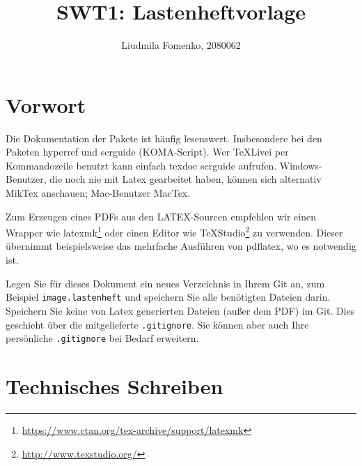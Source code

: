 \documentclass[parskip=full]{scrartcl}
\title{SWT1: Lastenheftvorlage}
\author{Liudmila Fomenko, 2080062}
\begin{document}
\maketitle

%
%
\section{Vorwort}
Die Dokumentation der Pakete ist häufig lesenswert.
Insbesondere bei den Paketen hyperref und scrguide (KOMA-Script).
Wer TeXLivei per Kommandozeile benutzt kann einfach texdoc scrguide aufrufen.
Windows-Benutzer, die noch nie mit Latex gearbeitet haben, können sich alternativ MikTex anschauen; Mac-Benutzer MacTex.

Zum Erzeugen eines PDFs aus den LATEX-Sourcen empfehlen wir einen Wrapper wie latexmk\footnote{\url{https://www.ctan.org/tex-archive/support/latexmk}} oder einen Editor wie TeXStudio\footnote{\url{http://www.texstudio.org/}} zu verwenden.
Dieser übernimmt beispielsweise das mehrfache Ausführen von pdflatex, wo es notwendig ist.

Legen Sie für dieses Dokument ein neues Verzeichnis in Ihrem Git an, zum Beispiel \texttt{image.lastenheft} und speichern Sie alle benötigten Dateien darin.
Speichern Sie keine von Latex generierten Dateien (außer dem PDF) im Git.
Dies geschieht über die mitgelieferte \texttt{.gitignore}.
Sie können aber auch Ihre persönliche \texttt{.gitignore} bei Bedarf erweitern.



\section{Technisches Schreiben}
\end{document}
